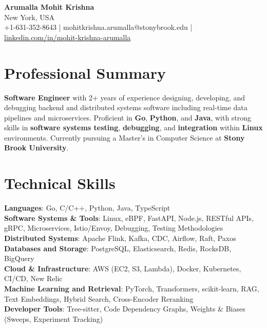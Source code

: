 \documentclass[letterpaper,11pt]{article}
\begin{document}
\begin{center}
  {\Large \textbf{Arumalla Mohit Krishna}} \\
  New York, USA \\
  +1-631-352-8643 \enspace | \enspace mohitkrishna.arumalla@stonybrook.edu \enspace | \enspace \href{https://www.linkedin.com/in/mohit-krishna-arumalla}{linkedin.com/in/mohit-krishna-arumalla}
\end{center}

\section{Professional Summary}
  \begin{itemize}[leftmargin=0.15in, label={}]
    \small{\item{
     \textbf{Software Engineer} with 2+ years of experience designing, developing, and debugging backend and distributed systems software including real-time data pipelines and microservices. Proficient in \textbf{Go}, \textbf{Python}, and \textbf{Java}, with strong skills in \textbf{software systems testing}, \textbf{debugging}, and \textbf{integration} within \textbf{Linux} environments. Currently pursuing a Master’s in Computer Science at \textbf{Stony Brook University}.
    }}
  \end{itemize}
\vspace{-16pt}

\section{Technical Skills}
 \begin{itemize}[leftmargin=0.15in, label={}]
    \small{\item{
     \textbf{Languages}: Go, C/C++, Python, Java, TypeScript \\
     \textbf{Software Systems \& Tools}: Linux, eBPF, FastAPI, Node.js, RESTful APIs, gRPC, Microservices, Istio/Envoy, Debugging, Testing Methodologies \\
     \textbf{Distributed Systems}: Apache Flink, Kafka, CDC, Airflow, Raft, Paxos \\
     \textbf{Databases and Storage}: PostgreSQL, Elasticsearch, Redis, RocksDB, BigQuery \\
     \textbf{Cloud \& Infrastructure}: AWS (EC2, S3, Lambda), Docker, Kubernetes, CI/CD, New Relic \\
     \textbf{Machine Learning and Retrieval}: PyTorch, Transformers, scikit-learn, RAG, Text Embeddings, Hybrid Search, Cross-Encoder Reranking \\
     \textbf{Developer Tools}: Tree-sitter, Code Dependency Graphs, Weights \& Biases (Sweeps, Experiment Tracking)
    }}
 \end{itemize}
\vspace{-16pt}
\end{document}
